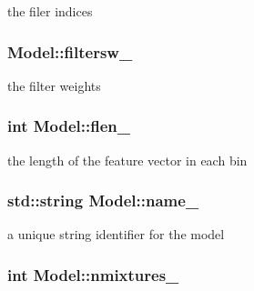 the filer indices 

\hypertarget{class_model_ac8594fac5ef6d874cf0a4f2fd856914d}{
\subsubsection[{filtersw\-\_\-}]{ Model\-::filtersw\-\_\-\hspace{0.3cm}{\ttfamily [protected]}}}\label{class_model_ac8594fac5ef6d874cf0a4f2fd856914d}


the filter weights 

\hypertarget{class_model_afafec86aa7175a4664ae76d545f084ea}{
\subsubsection[{flen\-\_\-}]{\setlength{\rightskip}{0pt plus 5cm}int Model\-::flen\-\_\-\hspace{0.3cm}{\ttfamily [protected]}}}\label{class_model_afafec86aa7175a4664ae76d545f084ea}


the length of the feature vector in each bin 

\hypertarget{class_model_afca3bde5ad33e936c455d3d311b8406d}{
\subsubsection[{name\-\_\-}]{\setlength{\rightskip}{0pt plus 5cm}std\-::string Model\-::name\-\_\-\hspace{0.3cm}{\ttfamily [protected]}}}\label{class_model_afca3bde5ad33e936c455d3d311b8406d}


a unique string identifier for the model 

\hypertarget{class_model_a047a8d7591bde166f0c3ab36a2130b53}{
\subsubsection[{nmixtures\-\_\-}]{\setlength{\rightskip}{0pt plus 5cm}int Model\-::nmixtures\-\_\-\hspace{0.3cm}{\ttfamily [protected]}}}\label{class_model_a047a8d7591bde166f0c3ab36a2130b53}



